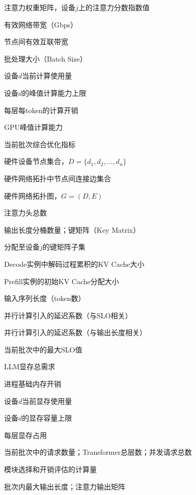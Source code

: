 
\begin{denotation}[3cm]

  \item[$A^{(j)}$]注意力权重矩阵，设备$j$上的注意力分数指数值
  \item[$B$]有效网络带宽（Gbps）
  \item[$B_{\text{net}}$]节点间有效互联带宽
  \item[$B_{sz}$]批处理大小（Batch Size）
  \item[$C_d$]设备$d$当前计算使用量
  \item[$C^{\max}_d$]设备$d$的峰值计算能力上限
  \item[$C_\ell$]每层每token的计算开销
  \item[$C_{\text{gpu}}$]GPU峰值计算能力
  \item[$CM$]当前批次综合优化指标
  \item[$D$]硬件设备节点集合，$D=\{d_1,d_2,\ldots,d_n\}$
  \item[$E$]硬件网络拓扑中节点间连接边集合
  \item[$G$]硬件网络拓扑图，$G=(D,E)$
  \item[$H$]注意力头总数
  \item[$K$]输出长度分桶数量；键矩阵（Key Matrix）
  \item[$K^{(j)}$]分配至设备$j$的键矩阵子集
  \item[$K_{\text{acc}}$]Decode实例中解码过程累积的KV Cache大小
  \item[$K_{\text{init}}$]Prefill实例的初始KV Cache分配大小
  \item[$L$]输入序列长度（token数）
  \item[$L_1$]并行计算引入的延迟系数（与SLO相关）
  \item[$L_2$]并行计算引入的延迟系数（与输出长度相关）
  \item[$L_{CM}$]当前批次中的最大SLO值
  \item[$M$]LLM显存总需求
  \item[$M_0$]进程基础内存开销
  \item[$M_d$]设备$d$当前显存使用量
  \item[$M^{\max}_d$]设备$d$的显存容量上限
  \item[$M_\ell$]每层显存占用
  \item[$N$]当前批次中的请求数量；Transformer总层数；并发请求总数
  \item[$N_m$]模块选择和开销评估的计算量
  \item[$O$]批次内最大输出长度；注意力输出矩阵

\end{denotation}
